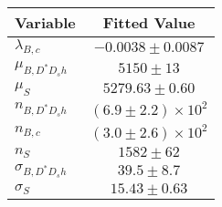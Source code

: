 \begin{tabular}[t]{lc}
\hline
Variable &Fitted Value\\
\hline\hline
$\lambda_{B,c}$&$-0.0038\pm0.0087$\\
\hline
$\mu_{B, D^* D_s h}$&$5150\pm13$\\
\hline
$\mu_S$&$5279.63\pm0.60$\\
\hline
$n_{B, D^* D_s h}$&$(6.9\pm2.2)\times 10^2$\\
\hline
$n_{B,c}$&$(3.0\pm2.6)\times 10^2$\\
\hline
$n_S$&$1582\pm62$\\
\hline
$\sigma_{B, D^* D_s h}$&$39.5\pm8.7$\\
\hline
$\sigma_S$&$15.43\pm0.63$\\
\hline
\end{tabular}